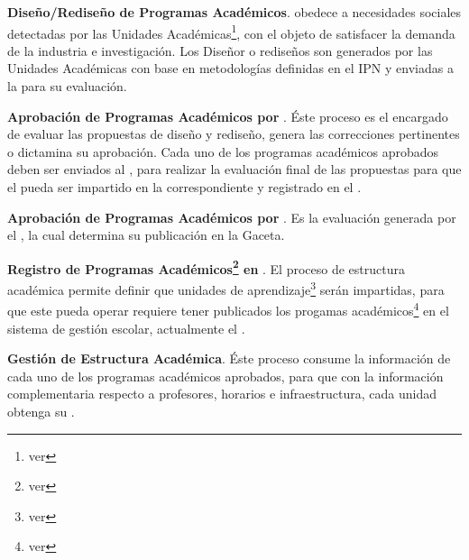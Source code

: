 
\begin{ADescripcion}

	\item \textbf{Diseño/Rediseño de Programas Académicos}.  obedece a necesidades sociales detectadas por las Unidades Académicas\footnote{ver }, con el objeto de satisfacer la demanda de la industria e investigación. Los Diseñor o rediseños son generados por las Unidades Académicas con base en metodologías definidas en el IPN y enviadas a la  para  su evaluación.

	\item \textbf{Aprobación de Programas Académicos por }. Éste proceso es el encargado de evaluar las propuestas de diseño y rediseño, genera las correcciones pertinentes o dictamina su aprobación. Cada uno de los programas académicos aprobados deben ser  enviados al  , para realizar la evaluación final de las propuestas para que el  pueda ser impartido en la  correspondiente y registrado en el .

	\item \textbf{Aprobación de Programas Académicos por }. Es la evaluación generada por el , la cual determina su publicación en la Gaceta.

	\item \textbf{Registro de Programas Académicos\footnote{ver } en }.  El proceso de estructura académica permite definir que unidades de aprendizaje\footnote{ver } serán impartidas, para que este pueda operar requiere tener publicados los progamas académicos\footnote{ver } en el sistema de gestión escolar, actualmente el .

	\item \textbf{Gestión de Estructura Académica}. Éste proceso consume la información de cada uno de los programas académicos aprobados, para que con la información complementaria respecto a profesores, horarios e infraestructura, cada unidad obtenga su .  
	
\end{ADescripcion}

